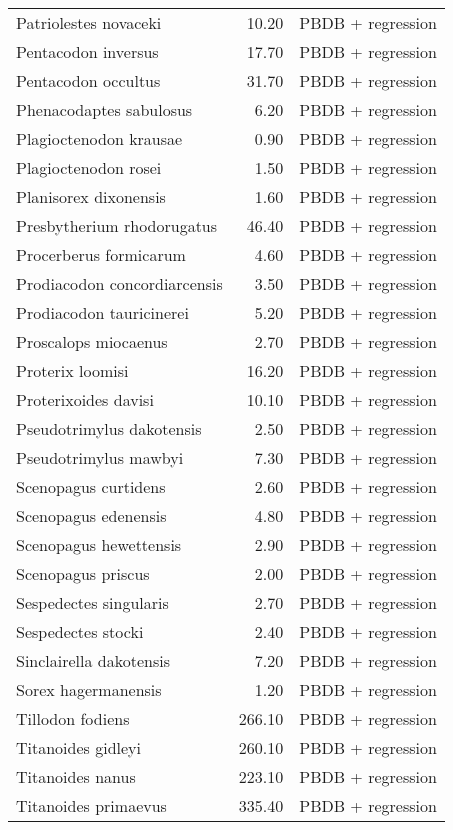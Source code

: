 \begin{table}[ht]
\begin{tabular}{lrl}
  Patriolestes novaceki & 10.20 & PBDB + regression \\ 
  Pentacodon inversus & 17.70 & PBDB + regression \\ 
  Pentacodon occultus & 31.70 & PBDB + regression \\ 
  Phenacodaptes sabulosus & 6.20 & PBDB + regression \\ 
  Plagioctenodon krausae & 0.90 & PBDB + regression \\ 
  Plagioctenodon rosei & 1.50 & PBDB + regression \\ 
  Planisorex dixonensis & 1.60 & PBDB + regression \\ 
  Presbytherium rhodorugatus & 46.40 & PBDB + regression \\ 
  Procerberus formicarum & 4.60 & PBDB + regression \\ 
  Prodiacodon concordiarcensis & 3.50 & PBDB + regression \\ 
  Prodiacodon tauricinerei & 5.20 & PBDB + regression \\ 
  Proscalops miocaenus & 2.70 & PBDB + regression \\ 
  Proterix loomisi & 16.20 & PBDB + regression \\ 
  Proterixoides davisi & 10.10 & PBDB + regression \\ 
  Pseudotrimylus dakotensis & 2.50 & PBDB + regression \\ 
  Pseudotrimylus mawbyi & 7.30 & PBDB + regression \\ 
  Scenopagus curtidens & 2.60 & PBDB + regression \\ 
  Scenopagus edenensis & 4.80 & PBDB + regression \\ 
  Scenopagus hewettensis & 2.90 & PBDB + regression \\ 
  Scenopagus priscus & 2.00 & PBDB + regression \\ 
  Sespedectes singularis & 2.70 & PBDB + regression \\ 
  Sespedectes stocki & 2.40 & PBDB + regression \\ 
  Sinclairella dakotensis & 7.20 & PBDB + regression \\ 
  Sorex hagermanensis & 1.20 & PBDB + regression \\ 
  Tillodon fodiens & 266.10 & PBDB + regression \\ 
  Titanoides gidleyi & 260.10 & PBDB + regression \\ 
  Titanoides nanus & 223.10 & PBDB + regression \\ 
  Titanoides primaevus & 335.40 & PBDB + regression \\ 

\end{tabular}
\end{table}
